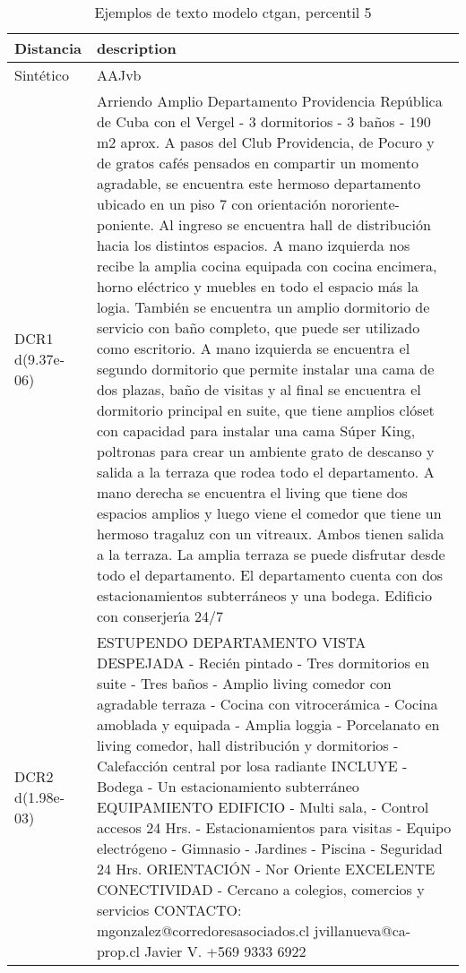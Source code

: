 \begin{table}[H]
\centering
\fontsize{10}{14}\selectfont
\caption{Ejemplos de texto modelo ctgan, percentil 5}
\label{table-example-economicos-a-3-ctgan-5p-text}
\begin{tabular}{|l|m{35em}|}
\hline
\rowcolor[gray]{0.8}
Distancia & description \\
\hline Sintético & AAJvb \\
\hline DCR1 d(9.37e-06) & Arriendo Amplio Departamento Providencia   Rep\'ublica de Cuba con el Vergel - 3 dormitorios - 3 ba\~nos - 190 m2 aprox.  A pasos del Club Providencia, de Pocuro y de gratos caf\'es pensados en compartir un momento agradable, se encuentra este hermoso departamento ubicado en un piso 7 con orientaci\'on nororiente-poniente. Al ingreso se encuentra hall de distribuci\'on hacia los distintos espacios. A mano izquierda nos recibe la amplia cocina equipada con cocina encimera, horno el\'ectrico y muebles en todo el espacio m\'as la logia. Tambi\'en se encuentra un amplio dormitorio de servicio con ba\~no completo, que puede ser utilizado como escritorio. A mano izquierda se encuentra el segundo dormitorio que permite instalar una cama de dos plazas, ba\~no de visitas y al final se encuentra el dormitorio principal en suite, que tiene amplios cl\'oset con capacidad para instalar una cama S\'uper King, poltronas para crear un ambiente grato de descanso y salida a la terraza que rodea todo el departamento. A mano derecha se encuentra el living que tiene dos espacios amplios y luego viene el comedor que tiene un hermoso tragaluz con un vitreaux. Ambos tienen salida a la terraza. La amplia terraza se puede disfrutar desde todo el departamento. El departamento cuenta con dos estacionamientos subterr\'aneos y una bodega. Edificio con conserjer{\'\i}a 24/7 \\
\hline DCR2 d(1.98e-03) & ESTUPENDO DEPARTAMENTO VISTA DESPEJADA  - Reci\'en pintado - Tres dormitorios en suite - Tres ba\~nos - Amplio living comedor con agradable terraza - Cocina con vitrocer\'amica - Cocina amoblada y equipada - Amplia loggia  - Porcelanato en living comedor, hall distribuci\'on y dormitorios - Calefacci\'on central por losa radiante  INCLUYE - Bodega - Un estacionamiento subterr\'aneo  EQUIPAMIENTO EDIFICIO - Multi sala, - Control accesos 24 Hrs. - Estacionamientos para visitas - Equipo electr\'ogeno - Gimnasio - Jardines  - Piscina  - Seguridad 24 Hrs.  ORIENTACI\'ON - Nor Oriente  EXCELENTE CONECTIVIDAD - Cercano a colegios, comercios y servicios  CONTACTO: mgonzalez@corredoresasociados.cl jvillanueva@ca-prop.cl Javier V. +569 9333 6922 \\
\hline
\end{tabular}
\end{table}
